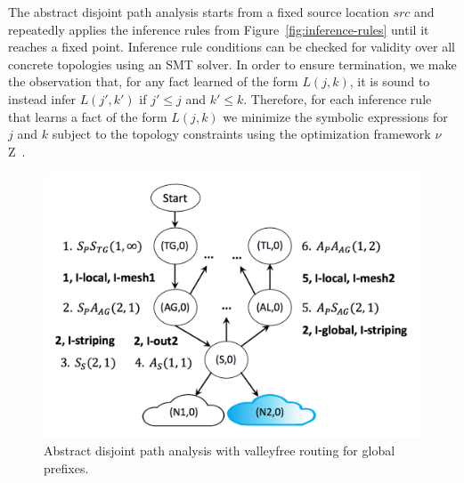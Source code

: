 \documentclass[numbers, 10pt, preprint]{sigplanconf}
\begin{document}
The abstract disjoint path analysis starts from a fixed source location $src$ and repeatedly applies the inference rules from Figure~\ref{fig:inference-rules} until it reaches a fixed point. Inference rule conditions can be checked for validity over all concrete topologies using an SMT solver. In order to ensure termination, we make the observation that, for any fact learned of the form $L(j,k)$, it is sound to instead infer $L(j',k')$ if $j' \leq j$ and $k' \leq k$. Therefore, for each inference rule that learns a fact of the form $L(j,k)$ we minimize the symbolic expressions for $j$ and $k$ subject to the topology constraints using the optimization framework $\nu$Z~\cite{z3opt}.

\begin{figure}
  \begin{center}
    \includegraphics[width=\columnwidth]{figures/analysis}
  \end{center}
  \caption{Abstract disjoint path analysis with valleyfree routing for global prefixes. \label{fig:compilation-times}}
  \label{fig:example-inference}
  \vspace{-1em}
\end{figure}
\end{document}

